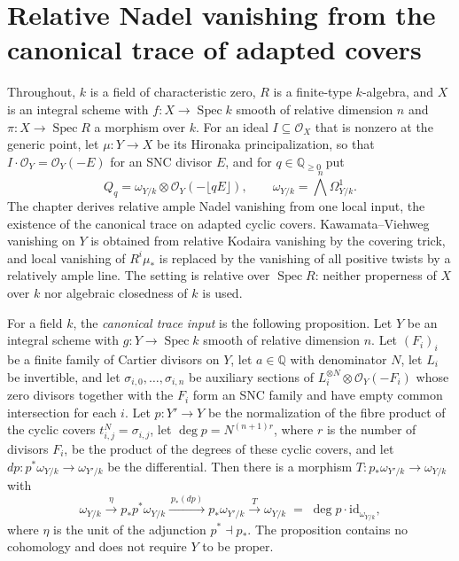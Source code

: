 \section{Relative Nadel vanishing from the canonical trace of adapted covers}
\label{sec:kn-relative-nadel-assembly}

Throughout, $k$ is a field of characteristic zero, $R$ is a finite-type
$k$-algebra, and $X$ is an integral scheme with $f:X\to\operatorname{Spec}k$
smooth of relative dimension $n$ and $\pi:X\to\operatorname{Spec}R$ a morphism
over $k$. For an ideal $I\subseteq\mathcal O_X$ that is nonzero at the generic
point, let $\mu:Y\to X$ be its Hironaka principalization, so that
$I\cdot\mathcal O_Y=\mathcal O_Y(-E)$ for an SNC divisor $E$, and for
$q\in\mathbb Q_{\geq0}$ put
\[
 Q_q=\omega_{Y/k}\otimes\mathcal O_Y(-\lfloor qE\rfloor),\qquad
 \omega_{Y/k}=\textstyle\bigwedge^n\Omega^1_{Y/k}.
\]
The chapter derives relative ample Nadel vanishing from one local input, the
existence of the canonical trace on adapted cyclic covers. Kawamata--Viehweg
vanishing on $Y$ is obtained from relative Kodaira vanishing by the covering
trick, and local vanishing of $R^i\mu_*$ is replaced by the vanishing of all
positive twists by a relatively ample line. The setting is relative over
$\operatorname{Spec}R$: neither properness of $X$ over $k$ nor algebraic
closedness of $k$ is used.

\begin{definition}
\label{def:kn-relative-nadel-cover-trace-input}
\leanok
For a field $k$, the \emph{canonical trace input} is the following
proposition. Let $Y$ be an integral scheme with $g:Y\to\operatorname{Spec}k$
smooth of relative dimension $n$. Let $(F_i)_{i}$ be a finite family of Cartier
divisors on $Y$, let $a\in\mathbb Q$ with denominator $N$, let $L_i$ be
invertible, and let $\sigma_{i,0},\dots,\sigma_{i,n}$ be auxiliary sections of
$L_i^{\otimes N}\otimes\mathcal O_Y(-F_i)$ whose zero divisors together with
the $F_i$ form an SNC family and have empty common intersection for each $i$.
Let $p:Y'\to Y$ be the normalization of the fibre product of the cyclic covers
$t_{i,j}^N=\sigma_{i,j}$, let $\deg p=N^{(n+1)r}$, where $r$ is the number of
divisors $F_i$, be the product of the degrees of these cyclic covers, and let
$dp:p^*\omega_{Y/k}\to\omega_{Y'/k}$ be the differential. Then there is a morphism
$T:p_*\omega_{Y'/k}\to\omega_{Y/k}$ with
\[
 \omega_{Y/k}\xrightarrow{\ \eta\ }p_*p^*\omega_{Y/k}
   \xrightarrow{\ p_*(dp)\ }p_*\omega_{Y'/k}\xrightarrow{\ T\ }\omega_{Y/k}
 \;=\;\deg p\cdot\mathrm{id}_{\omega_{Y/k}},
\]
where $\eta$ is the unit of the adjunction $p^*\dashv p_*$. The proposition
contains no cohomology and does not require $Y$ to be proper.
\end{definition}


